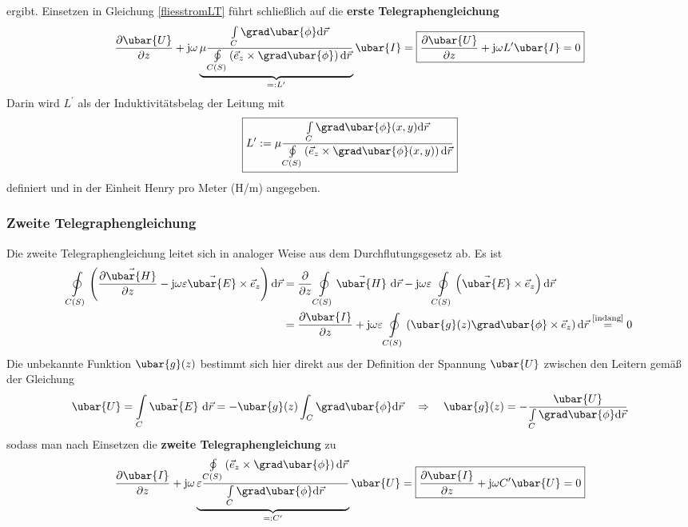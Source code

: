 ergibt. Einsetzen in Gleichung \ref{fliesstromLT} führt schließlich auf die \textbf{erste Telegraphengleichung}
\begin{equation}\label{ersttel}
	\frac{\partial \ubar{U}}{\partial z}+\mathrm{j} \omega \underbrace{\mu\frac{\int\limits_{C} \grad \ubar{\phi} \mathrm{d} \vec{r}}{\oint\limits_{C(S)}\left(\vec{e}_{z} \times \grad \ubar{\phi}\right) \mathrm{d} \vec{r}}}_{=: L^{\prime}} \ubar{I}=\boxed{\frac{\partial \ubar{U}}{\partial z}+\mathrm{j} \omega L^{\prime} \ubar{I}=0 }
\end{equation}
Darin wird $L^{\prime}$ als der Induktivitätsbelag der Leitung mit
\begin{equation}\label{indbelag}
	\boxed{L^{\prime}:=\mu \frac{\int\limits_{C} \grad \ubar{\phi}(x, y) \mathrm{d} \vec{r}}{\oint\limits_{C(S)}\left(\vec{e}_{z} \times \grad \ubar{\phi}(x, y)\right) \mathrm{d} \vec{r}} }
\end{equation}
definiert und in der Einheit Henry pro Meter (H/m) angegeben.
\subsubsection{Zweite Telegraphengleichung}
 Die zweite Telegraphengleichung leitet sich in analoger Weise aus dem Durchflutungsgesetz ab. Es ist
\begin{align}
\oint\limits_{C(S)}\left(\frac{\partial \vec{\ubar{H}}}{\partial z}-\mathrm{j} \omega \varepsilon \vec{\ubar{E}} \times \vec{e}_z\right) \mathrm{d} \vec{r} & =\frac{\partial}{\partial z} \oint\limits_{C(S)} \vec{\ubar{H}} \mathrm{~d} \vec{r}-\mathrm{j} \omega \varepsilon \oint\limits_{C(S)}\left(\vec{\ubar{E}} \times \vec{e}_z\right) \mathrm{d} \vec{r} \\
& =\frac{\partial \ubar{I}}{\partial z}+\mathrm{j} \omega \varepsilon \oint\limits_{C(S)}\left(\ubar{g}(z) \grad \ubar{\phi} \times \vec{e}_z\right) \mathrm{d} \vec{r}\stackrel{\text{\ref{indang}}}{=}0
\end{align}
Die unbekannte Funktion $\ubar{g}(z)$ bestimmt sich hier direkt aus der Definition der Spannung $\ubar{U}$ zwischen den Leitern gemäß der Gleichung
\begin{equation}
	\ubar{U}=\int\limits_{C} \vec{\ubar{E}} \mathrm{~d} \vec{r}=-\ubar{g}(z) \int_{C} \grad \ubar{\phi} \mathrm{d} \vec{r} \quad \Rightarrow \quad \ubar{g}(z)=-\frac{\ubar{U}}{\int\limits_{C} \grad \ubar{\phi} \mathrm{d} \vec{r}} 
\end{equation}
sodass man nach Einsetzen die \textbf{zweite Telegraphengleichung} zu
\begin{equation}\label{zweittel}
	\frac{\partial \ubar{I}}{\partial z}+\mathrm{j} \omega \underbrace{\varepsilon\frac{\oint\limits_{C(S)}\left(\vec{e}_z \times\grad \ubar{\phi}\right) \mathrm{d} \vec{r}}{\int\limits_C\grad \ubar{\phi} \mathrm{d} \vec{r}}}_{=: C^{\prime}} \ubar{U}=\boxed{\frac{\partial \ubar{I}}{\partial z}+\mathrm{j} \omega C^{\prime} \ubar{U}=0} \end{equation}

